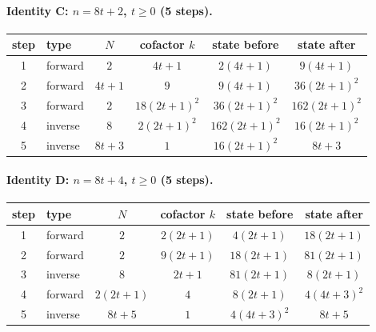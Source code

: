 \paragraph{Identity C: $n=8t+2$, $t\ge 0$ (5 steps).}
\begin{center}\footnotesize
\begin{tabular}{@{}clcccc@{}}\toprule
step & type & $N$ & cofactor $k$ & state before & state after \\ \midrule
1 & forward & $2$ & $4 t + 1$ & $2 \left(4 t + 1\right)$ & $9 \left(4 t + 1\right)$ \\
2 & forward & $4 t + 1$ & $9$ & $9 \left(4 t + 1\right)$ & $36 \left(2 t + 1\right)^{2}$ \\
3 & forward & $2$ & $18 \left(2 t + 1\right)^{2}$ & $36 \left(2 t + 1\right)^{2}$ & $162 \left(2 t + 1\right)^{2}$ \\
4 & inverse & $8$ & $2 \left(2 t + 1\right)^{2}$ & $162 \left(2 t + 1\right)^{2}$ & $16 \left(2 t + 1\right)^{2}$ \\
5 & inverse & $8 t + 3$ & $1$ & $16 \left(2 t + 1\right)^{2}$ & $8 t + 3$ \\
\bottomrule\end{tabular}\end{center}
\paragraph{Identity D: $n=8t+4$, $t\ge 0$ (5 steps).}
\begin{center}\footnotesize
\begin{tabular}{@{}clcccc@{}}\toprule
step & type & $N$ & cofactor $k$ & state before & state after \\ \midrule
1 & forward & $2$ & $2 \left(2 t + 1\right)$ & $4 \left(2 t + 1\right)$ & $18 \left(2 t + 1\right)$ \\
2 & forward & $2$ & $9 \left(2 t + 1\right)$ & $18 \left(2 t + 1\right)$ & $81 \left(2 t + 1\right)$ \\
3 & inverse & $8$ & $2 t + 1$ & $81 \left(2 t + 1\right)$ & $8 \left(2 t + 1\right)$ \\
4 & forward & $2 \left(2 t + 1\right)$ & $4$ & $8 \left(2 t + 1\right)$ & $4 \left(4 t + 3\right)^{2}$ \\
5 & inverse & $8 t + 5$ & $1$ & $4 \left(4 t + 3\right)^{2}$ & $8 t + 5$ \\
\bottomrule\end{tabular}\end{center}
